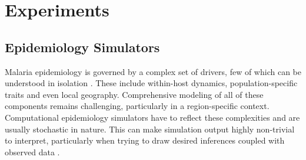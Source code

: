 \documentclass{article}
\begin{document}

\section{Experiments}
\subsection{Epidemiology Simulators}

Malaria epidemiology is governed by a complex set of drivers, 
few of which can be understood in isolation \cite{cameron2015defining,autino_epidemiology_2012,smith2008towards,bershteyn2018implementation}.
These include within-host dynamics, population-specific traits and even local geography.
Comprehensive modeling of all of these components remains challenging, particularly in a region-specific context. 
Computational epidemiology simulators have to reflect these complexities and are usually stochastic in nature. This can make simulation output highly non-trivial to interpret, particularly when trying to draw desired inferences coupled with observed data \cite{mwendera_challenges_2019,ferris_openmalaria_2015}.
\end{document}
